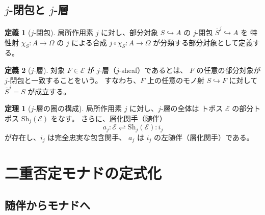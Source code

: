\documentclass[11pt,a4paper]{article}
\theoremstyle{definition}
\newtheorem{definition}{定義}[section]
\newtheorem{theorem}{定理}[section]
\newcommand{\topos}{\mathcal{E}}
\begin{document}
\subsection{\texorpdfstring{$j$}{j}-閉包と \texorpdfstring{$j$}{j}-層}

\begin{definition}[\texorpdfstring{$j$}{j}-閉包]
局所作用素 $j$ に対し、部分対象 $S \hookrightarrow A$ の
$j$-閉包 $\overline{S}^j \hookrightarrow A$ を
特性射 $\chi_S: A \to \Omega$ の $j$ による合成
$j \circ \chi_S: A \to \Omega$ が分類する部分対象として定義する。
\end{definition}

\begin{definition}[\texorpdfstring{$j$}{j}-層]
対象 $F \in \topos$ が $j$-層（$j$-sheaf）であるとは、
$F$ の任意の部分対象が $j$-閉包と一致することをいう。
すなわち、$F$ 上の任意のモノ射 $S \hookrightarrow F$ に対して
$\overline{S}^j = S$ が成立する。
\end{definition}

\begin{theorem}[\texorpdfstring{$j$}{j}-層の圏の構成]
局所作用素 $j$ に対し、$j$-層の全体は
トポス $\topos$ の部分トポス $\mathrm{Sh}_j(\topos)$ をなす。
さらに、層化関手（随伴）
\[
a_j : \topos \rightleftharpoons \mathrm{Sh}_j(\topos) : i_j
\]
が存在し、$i_j$ は完全忠実な包含関手、
$a_j$ は $i_j$ の左随伴（層化関手）である。
\end{theorem}

\section{二重否定モナドの定式化}

\subsection{随伴からモナドへ}
\end{document}
